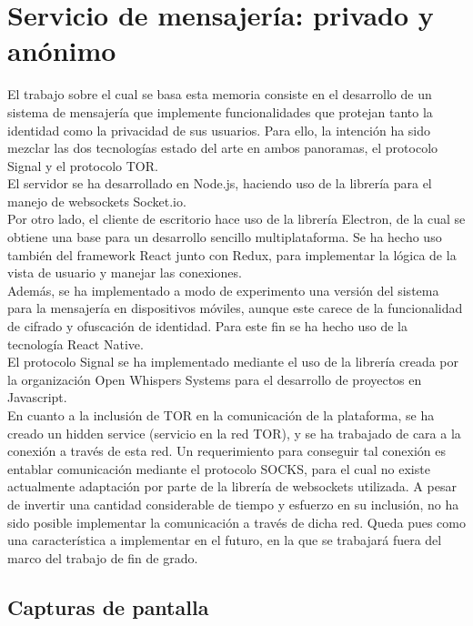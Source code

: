 \chapter{Servicio de mensajería: privado y anónimo}

El trabajo sobre el cual se basa esta memoria consiste en el desarrollo de un sistema de mensajería que implemente funcionalidades que protejan tanto la identidad como la privacidad de sus usuarios. Para ello, la intención ha sido mezclar las dos tecnologías estado del arte en ambos panoramas, el protocolo Signal y el protocolo TOR. \\

El servidor se ha desarrollado en Node.js, haciendo uso de la librería para el manejo de websockets Socket.io. \\

Por otro lado, el cliente de escritorio hace uso de la librería Electron, de la cual se obtiene una base para un desarrollo sencillo multiplataforma. Se ha hecho uso también del framework React junto con Redux, para implementar la lógica de la vista de usuario y manejar las conexiones. \\

Además, se ha implementado a modo de experimento una versión del sistema para la mensajería en dispositivos móviles, aunque este carece de la funcionalidad de cifrado y ofuscación de identidad. Para este fin se ha hecho uso de la tecnología React Native. \\

El protocolo Signal se ha implementado mediante el uso de la librería creada por la organización Open Whispers Systems para el desarrollo de proyectos en Javascript. \\

En cuanto a la inclusión de TOR en la comunicación de la plataforma, se ha creado un hidden service (servicio en la red TOR), y se ha trabajado de cara a la conexión a través de esta red. Un requerimiento para conseguir tal conexión es entablar comunicación mediante el protocolo SOCKS, para el cual no existe actualmente adaptación por parte de la librería de websockets utilizada. A pesar de invertir una cantidad considerable de tiempo y esfuerzo en su inclusión, no ha sido posible implementar la comunicación a través de dicha red. Queda pues como una característica a implementar en el futuro, en la que se trabajará fuera del marco del trabajo de fin de grado.

\section{Capturas de pantalla}


